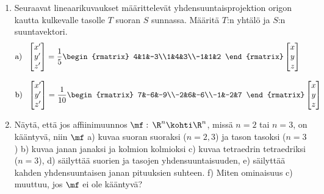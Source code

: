 \begin{enumerate}
\item
Seuraavat lineaarikuvaukset määrittelevät yhdensuuntaisprojektion origon kautta kulkevalle
tasolle $T$ suoran $S$ sunnassa. Määritä $T$:n yhtälö ja $S$:n suuntavektori.
\begin{align*}
&\text{a)}\ \ \begin{bmatrix} x'\\y'\\z' \end{bmatrix} =
              \frac{1}{5}\begin{rmatrix} 4&1&-3\\1&4&3\\-1&1&2 \end{rmatrix}
                         \begin{bmatrix} x\\y\\z \end{bmatrix} \\[3mm]
&\text{b)}\ \ \begin{bmatrix} x'\\y'\\z' \end{bmatrix} =
              \frac{1}{10}\begin{rmatrix} 7&-6&-9\\-2&6&-6\\-1&-2&7 \end{rmatrix}
                          \begin{bmatrix} x\\y\\z \end{bmatrix} 
\end{align*}

\item 
Näytä, että jos affiinimuunnos $\mf:\,\R^n\kohti\R^n$, missä $n=2$ tai $n=3$, on kääntyvä, niin
$\mf$  \vspace{1mm}\newline
a) kuvaa suoran suoraksi ($n=2,3$) ja tason tasoksi ($n=3$) \newline
b) kuvaa janan janaksi ja kolmion kolmioksi \newline
c) kuvaa tetraedrin tetraedriksi ($n=3$), \newline
d) säilyttää suorien ja tasojen yhdensuuntaisuuden, \newline
e) säilyttää kahden yhdensuuntaisen janan pituuksien suhteen. \newline
f) Miten ominaisuus c) muuttuu, jos $\mf$ ei ole kääntyvä?


\end{enumerate}
